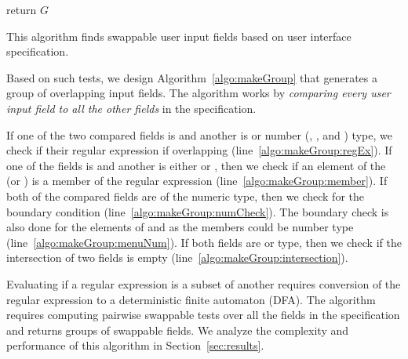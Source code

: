 \begin{algorithm}[!htpb]
{{{                }
                
                \If{$addField = true$}{
                    $g \leftarrow$ empty set of fields\\
                    $g.add(f, f_{in})$\\
                    $G.add(g)$\\
                    $addField \leftarrow false$
                }
        }
    }
    return $G$
\caption{\small{This algorithm finds swappable user input fields based on user interface specification.}} 
\label{algo:makeGroup}
\end{algorithm}

Based on such tests, we design Algorithm~\ref{algo:makeGroup} that generates a group of overlapping input fields. The algorithm works by \emph{comparing every user input field to all the other fields} in the specification.

If one of the two compared fields is \String and another is \string or number (\integer, \float, \Date and \Time) type, we check if their regular expression if overlapping (line~\ref{algo:makeGroup:regEx}). If one of the fields is \String and another is either \menu or \radio, then we check if an element of the \menu (or \radio) is a member of the \String regular expression (line~\ref{algo:makeGroup:member}). 
%
If both of the compared fields are of the numeric type, then we check for the boundary condition (line~\ref{algo:makeGroup:numCheck}). The boundary check is also done for the elements of \menu and \radio as the members could be number type (line~\ref{algo:makeGroup:menuNum}).
If both fields are \menu or \radio type, then we check if the intersection of two fields is empty (line~\ref{algo:makeGroup:intersection}).

Evaluating if a regular expression is a subset of another requires conversion of the regular expression to a deterministic finite automaton (DFA). The algorithm requires computing pairwise swappable tests over all the fields in the specification and returns groups of swappable fields. We analyze the complexity and performance of this algorithm in Section~\ref{sec:results}.


